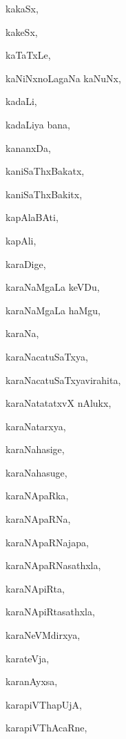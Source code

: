 \begin{multicols}{2}
{kakaSx}, \pageref{kakaSx}

{kakeSx}, \pageref{kakeSx}

{kaTaTxLe}, \pageref{kaTaTxLe}

{kaNiNxnoLagaNa kaNuNx}, \pageref{kaNiNxnoLagaNa kaNuNx}

{kadaLi}, \pageref{kadaLi}

{kadaLiya bana}, \pageref{kadaLiya bana}

{kananxDa}, \pageref{kananxDa}

{kaniSaThxBakatx}, \pageref{kaniSaThxBakatx}

{kaniSaThxBakitx}, \pageref{kaniSaThxBakitx}

{kapAlaBAti}, \pageref{kapAlaBAti}

{kapAli}, \pageref{kapAli}

{karaDige}, \pageref{karaDige}

{karaNaMgaLa keVDu}, \pageref{karaNaMgaLa keVDu}

{karaNaMgaLa haMgu}, \pageref{karaNaMgaLa haMgu}

{karaNa}, \pageref{karaNa}

{karaNacatuSaTxya}, \pageref{karaNacatuSaTxya}

{karaNacatuSaTxyavirahita}, \pageref{karaNacatuSaTxyavirahita}

{karaNatatatxvX nAlukx}, \pageref{karaNatatatxvX nAlukx}

{karaNatarxya}, \pageref{karaNatarxya}

{karaNahasige}, \pageref{karaNahasige}

{karaNahasuge}, \pageref{karaNahasuge}

{karaNApaRka}, \pageref{karaNApaRka}

{karaNApaRNa}, \pageref{karaNApaRNa}

{karaNApaRNajapa}, \pageref{karaNApaRNajapa}

{karaNApaRNasathxla}, \pageref{karaNApaRNasathxla}

{karaNApiRta}, \pageref{karaNApiRta}

{karaNApiRtasathxla}, \pageref{karaNApiRtasathxla}

{karaNeVMdirxya}, \pageref{karaNeVMdirxya}

{karateVja}, \pageref{karateVja}

{karanAyxsa}, \pageref{karanAyxsa}

{karapiVThapUjA}, \pageref{karapiVThapUjA}

{karapiVThAcaRne}, \pageref{karapiVThAcaRne}


\end{multicols}
